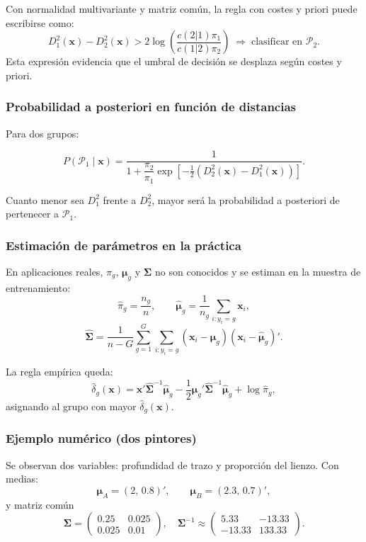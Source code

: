 \documentclass[12pt, a4paper]{article}
\theoremstyle{plain}
\theoremstyle{definition}
\theoremstyle{remark}
\begin{document}
\begin{mdframed}[style=resultado]
Con normalidad multivariante y matriz común, la regla con costes y priori
puede escribirse como:
\[
  D_1^2(\mathbf{x})-D_2^2(\mathbf{x})
  > 2\log\!\left(\frac{c(2|1)\pi_1}{c(1|2)\pi_2}\right)
  \;\Longrightarrow\;
  \text{clasificar en } \mathcal{P}_2.
\]
Esta expresión evidencia que el umbral de decisión se desplaza según costes y
priori.
\end{mdframed}

\subsubsection{Probabilidad a posteriori en función de distancias}

Para dos grupos:
\begin{mdframed}[style=resultado]
\[
  P(\mathcal{P}_1\mid\mathbf{x})=
  \frac{1}{
    1+\dfrac{\pi_2}{\pi_1}\exp\!\left[-\frac12\left(D_2^2(\mathbf{x})-D_1^2(\mathbf{x})\right)\right]
  }.
\]
\end{mdframed}
Cuanto menor sea $D_1^2$ frente a $D_2^2$, mayor será la probabilidad
a posteriori de pertenecer a $\mathcal{P}_1$.

\subsubsection{Estimación de parámetros en la práctica}

En aplicaciones reales, $\pi_g$, $\boldsymbol{\mu}_g$ y
$\boldsymbol{\Sigma}$ no son conocidos y se estiman en la muestra de
entrenamiento:
\[
  \hat{\pi}_g = \frac{n_g}{n},\qquad
  \hat{\boldsymbol{\mu}}_g = \frac{1}{n_g}\sum_{i:y_i=g}\mathbf{x}_i,
\]
\[
  \hat{\boldsymbol{\Sigma}}
  = \frac{1}{n-G}
    \sum_{g=1}^{G}\sum_{i:y_i=g}
    (\mathbf{x}_i-\hat{\boldsymbol{\mu}}_g)
    (\mathbf{x}_i-\hat{\boldsymbol{\mu}}_g)'.
\]

La regla empírica queda:
\[
  \hat{\delta}_g(\mathbf{x})=
  \mathbf{x}'\hat{\boldsymbol{\Sigma}}^{-1}\hat{\boldsymbol{\mu}}_g
  -\frac12\hat{\boldsymbol{\mu}}_g'\hat{\boldsymbol{\Sigma}}^{-1}\hat{\boldsymbol{\mu}}_g
  +\log\hat{\pi}_g,
\]
asignando al grupo con mayor $\hat{\delta}_g(\mathbf{x})$.

\subsubsection{Ejemplo numérico (dos pintores)}

Se observan dos variables: profundidad de trazo y proporción del lienzo.
Con medias:
\[
  \boldsymbol{\mu}_A=(2,\,0.8)',\qquad
  \boldsymbol{\mu}_B=(2.3,\,0.7)',
\]
y matriz común
\[
  \boldsymbol{\Sigma}=
  \begin{pmatrix}
    0.25 & 0.025\\
    0.025 & 0.01
  \end{pmatrix},
  \quad
  \boldsymbol{\Sigma}^{-1}\approx
  \begin{pmatrix}
    5.33 & -13.33\\
    -13.33 & 133.33
  \end{pmatrix}.
\]
\end{document}
